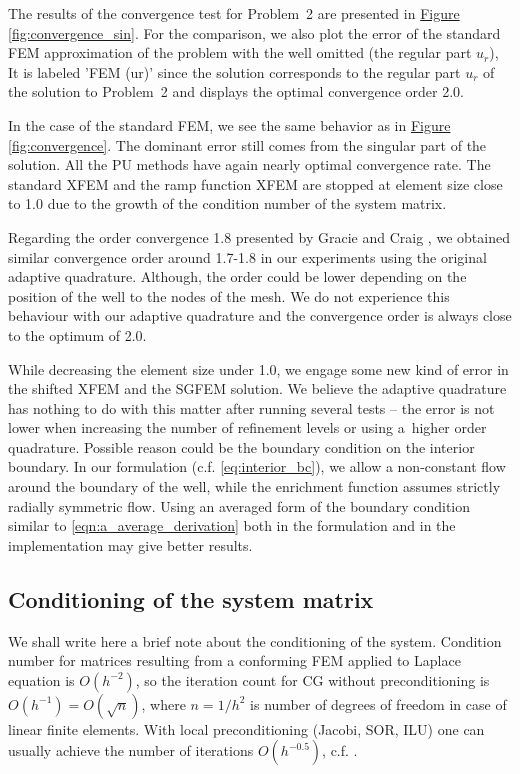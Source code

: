 \documentclass{elsarticle}
\newcommand{\prob}[1]{Problem~{#1}}
\newcommand{\fig}[1]{\hyperref[#1]{Figure \ref{#1}}}
\begin{document}
The results of the convergence test for \prob{2} are presented in \fig{fig:convergence_sin}.
For the comparison, we also plot the error of the standard FEM approximation of the problem with the well omitted (the regular part $u_r$), 
It is labeled 'FEM (ur)' since the solution corresponds to the regular part $u_r$ of the solution to \prob{2} and displays the optimal convergence order 2.0.

In the case of the standard FEM, we see the same behavior as in \fig{fig:convergence}. The dominant error still 
comes from the singular part of the solution. All the PU methods have again nearly optimal convergence rate. 
The standard XFEM and the ramp function XFEM
are stopped at element size close to 1.0 due to the growth of the condition number of the system matrix.

Regarding the order convergence 1.8 presented by Gracie and Craig \cite{gracie_modelling_2010}, we obtained similar convergence order 
around 1.7-1.8 in our experiments using the original adaptive quadrature. Although, the order could be lower 
depending on the position of the well to the nodes of the mesh. We do not experience this behaviour with our adaptive
quadrature and the convergence order is always close to the optimum of 2.0.

While decreasing the element size under 1.0, we engage some new kind of error in the shifted XFEM and the 
SGFEM solution. We believe the adaptive quadrature has nothing to do with this matter after running several tests 
-- the error is not lower when increasing the number
of refinement levels or using a~higher order quadrature. Possible reason could be the boundary condition 
on the interior boundary. In our formulation (c.f. \eqref{eq:interior_bc}), we allow a non-constant flow around the boundary
of the well, while the enrichment function assumes strictly radially symmetric flow. Using an averaged form of the boundary 
condition similar to \eqref{eqn:a_average_derivation} both in the formulation and in the implementation may give better results.


\subsection{Conditioning of the system matrix} \label{sec:res_conditioning}
We shall write here a brief note about the conditioning of the system.
Condition number for matrices resulting from a conforming FEM applied to Laplace equation is $O(h^{-2})$, so the iteration count 
for CG without preconditioning is $O(h^{-1})=O(\sqrt{n})$, where $n=1/h^2$ is number of degrees of freedom in case of linear finite elements. 
With local preconditioning (Jacobi, 
SOR, ILU) one can usually achieve the number of iterations $O(h^{-0.5})$, c.f. \cite{ern_evaluation_2006}.
\end{document}
